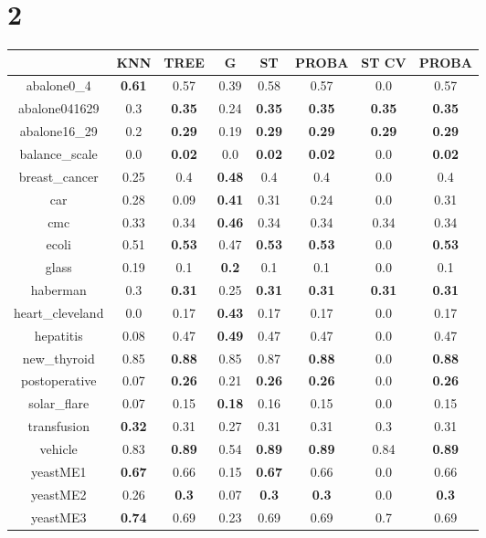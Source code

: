 \documentclass{article}%
\begin{document}
%
\section*{2}%
\begin{tabular}{c|ccccccc}%
\hline%
&KNN&TREE&G&ST&PROBA&ST CV&PROBA\\%
\hline%
abalone0\_4&\textbf{0.61}&0.57&0.39&0.58&0.57&0.0&0.57\\%
\hline%
abalone041629&0.3&\textbf{0.35}&0.24&\textbf{0.35}&\textbf{0.35}&\textbf{0.35}&\textbf{0.35}\\%
\hline%
abalone16\_29&0.2&\textbf{0.29}&0.19&\textbf{0.29}&\textbf{0.29}&\textbf{0.29}&\textbf{0.29}\\%
\hline%
balance\_scale&0.0&\textbf{0.02}&0.0&\textbf{0.02}&\textbf{0.02}&0.0&\textbf{0.02}\\%
\hline%
breast\_cancer&0.25&0.4&\textbf{0.48}&0.4&0.4&0.0&0.4\\%
\hline%
car&0.28&0.09&\textbf{0.41}&0.31&0.24&0.0&0.31\\%
\hline%
cmc&0.33&0.34&\textbf{0.46}&0.34&0.34&0.34&0.34\\%
\hline%
ecoli&0.51&\textbf{0.53}&0.47&\textbf{0.53}&\textbf{0.53}&0.0&\textbf{0.53}\\%
\hline%
glass&0.19&0.1&\textbf{0.2}&0.1&0.1&0.0&0.1\\%
\hline%
haberman&0.3&\textbf{0.31}&0.25&\textbf{0.31}&\textbf{0.31}&\textbf{0.31}&\textbf{0.31}\\%
\hline%
heart\_cleveland&0.0&0.17&\textbf{0.43}&0.17&0.17&0.0&0.17\\%
\hline%
hepatitis&0.08&0.47&\textbf{0.49}&0.47&0.47&0.0&0.47\\%
\hline%
new\_thyroid&0.85&\textbf{0.88}&0.85&0.87&\textbf{0.88}&0.0&\textbf{0.88}\\%
\hline%
postoperative&0.07&\textbf{0.26}&0.21&\textbf{0.26}&\textbf{0.26}&0.0&\textbf{0.26}\\%
\hline%
solar\_flare&0.07&0.15&\textbf{0.18}&0.16&0.15&0.0&0.15\\%
\hline%
transfusion&\textbf{0.32}&0.31&0.27&0.31&0.31&0.3&0.31\\%
\hline%
vehicle&0.83&\textbf{0.89}&0.54&\textbf{0.89}&\textbf{0.89}&0.84&\textbf{0.89}\\%
\hline%
yeastME1&\textbf{0.67}&0.66&0.15&\textbf{0.67}&0.66&0.0&0.66\\%
\hline%
yeastME2&0.26&\textbf{0.3}&0.07&\textbf{0.3}&\textbf{0.3}&0.0&\textbf{0.3}\\%
\hline%
yeastME3&\textbf{0.74}&0.69&0.23&0.69&0.69&0.7&0.69\\%

\end{tabular}
\end{document}
